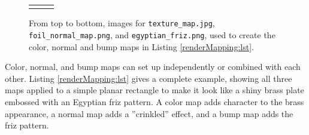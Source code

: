 \begin{figure}[ht]
\begin{center}
\begin{tabular}{ccc}
      \fi
   \end{tabular}
\end{center}
\caption{From top to bottom, images for 
{\tt texture\_map.jpg}, 
{\tt foil\_normal\_map.png}, and
{\tt egyptian\_friz.png}, 
used to create the color, normal and bump maps
in Listing \ref{renderMapping:lst}.}
\label{rawMappingImages:fig}
\end{figure}

Color, normal, and bump maps can set up independently or combined
with each other.  Listing \ref{renderMapping:lst} gives a complete
example, showing all three maps applied to a simple planar rectangle
to make it look like a shiny brass plate embossed with an Egyptian
friz pattern. A color map adds character to the brass appearance, a
normal map adds a ''crinkled'' effect, and a bump map adds the friz
pattern.

